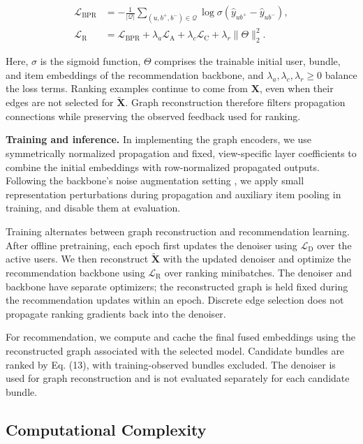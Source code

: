 \documentclass[letterpaper]{article}
\begin{document}
\begin{equation}
\begin{aligned}
\mathcal L_{\mathrm{BPR}}
&=-\frac{1}{|\mathcal Q|}
\sum_{(u,b^+,b^-)\in\mathcal Q}
\log\sigma\!\left(\hat y_{ub^+}-\hat y_{ub^-}\right),\\
\mathcal L_{\mathrm R}
&=\mathcal L_{\mathrm{BPR}}
+\lambda_a\mathcal L_{\mathrm A}
+\lambda_c\mathcal L_{\mathrm C}
+\lambda_r\|\Theta\|_2^2.
\end{aligned}
\tag{15}
\end{equation}

Here, $\sigma$ is the sigmoid function, $\Theta$ comprises the trainable initial user, bundle, and item embeddings of the recommendation backbone, and $\lambda_a,\lambda_c,\lambda_r\geq0$ balance the loss terms. Ranking examples continue to come from $\mathbf X$, even when their edges are not selected for $\widetilde{\mathbf X}$. Graph reconstruction therefore filters propagation connections while preserving the observed feedback used for ranking.

\textbf{Training and inference.} In implementing the graph encoders, we use symmetrically normalized propagation and fixed, view-specific layer coefficients to combine the initial embeddings with row-normalized propagated outputs. Following the backbone's noise augmentation setting \cite{ma2024multicbr}, we apply small representation perturbations during propagation and auxiliary item pooling in training, and disable them at evaluation.

Training alternates between graph reconstruction and recommendation learning. After offline pretraining, each epoch first updates the denoiser using $\mathcal L_{\mathrm D}$ over the active users. We then reconstruct $\widetilde{\mathbf X}$ with the updated denoiser and optimize the recommendation backbone using $\mathcal L_{\mathrm R}$ over ranking minibatches. The denoiser and backbone have separate optimizers; the reconstructed graph is held fixed during the recommendation updates within an epoch. Discrete edge selection does not propagate ranking gradients back into the denoiser.

For recommendation, we compute and cache the final fused embeddings using the reconstructed graph associated with the selected model. Candidate bundles are ranked by Eq. (13), with training-observed bundles excluded. The denoiser is used for graph reconstruction and is not evaluated separately for each candidate bundle.

\subsection{Computational Complexity}
\end{document}
